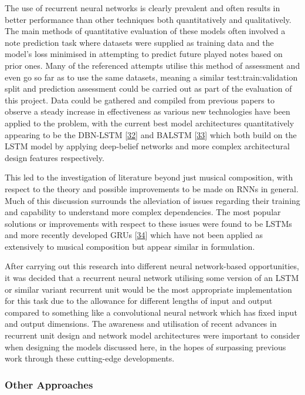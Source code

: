 \documentclass[12pt,]{article}
\begin{document}
The use of recurrent neural networks is clearly prevalent and often
results in better performance than other techniques both quantitatively
and qualitatively. The main methods of quantitative evaluation of these
models often involved a note prediction task where datasets were
supplied as training data and the model's loss minimised in attempting
to predict future played notes based on prior ones. Many of the
referenced attempts utilise this method of assessment and even go so far
as to use the same datasets, meaning a similar test:train:validation
split and prediction assessment could be carried out as part of the
evaluation of this project. Data could be gathered and compiled from
previous papers to observe a steady increase in effectiveness as various
new technologies have been applied to the problem, with the current best
model architectures quantitatively appearing to be the DBN-LSTM
{[}\protect\hyperlink{ref-vohra2015modeling}{32}{]} and BALSTM
{[}\protect\hyperlink{ref-johnson2017generating}{33}{]} which both build
on the LSTM model by applying deep-belief networks and more complex
architectural design features respectively.

This led to the investigation of literature beyond just musical
composition, with respect to the theory and possible improvements to be
made on RNNs in general. Much of this discussion surrounds the
alleviation of issues regarding their training and capability to
understand more complex dependencies. The most popular solutions or
improvements with respect to these issues were found to be LSTMs and
more recently developed GRUs
{[}\protect\hyperlink{ref-cho2014learning}{34}{]} which have not been
applied as extensively to musical composition but appear similar in
formulation.

After carrying out this research into different neural network-based
opportunities, it was decided that a recurrent neural network utilising
some version of an LSTM or similar variant recurrent unit would be the
most appropriate implementation for this task due to the allowance for
different lengths of input and output compared to something like a
convolutional neural network which has fixed input and output
dimensions. The awareness and utilisation of recent advances in
recurrent unit design and network model architectures were important to
consider when designing the models discussed here, in the hopes of
surpassing previous work through these cutting-edge developments.

\hypertarget{other-approaches}{%
\subsubsection{Other Approaches}\label{other-approaches}}
\end{document}
